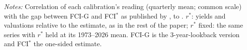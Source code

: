 \begin{table}[tbp]\centering
\caption{Readings and the Gap to FCI*}\label{tab:fcistar}
\begin{flushleft}\footnotesize\textit{Notes:} Correlation of each calibration's reading (quarterly mean; common scale) with the gap between FCI-G and FCI$^*$ as published by \citet{caballero2026},  to . $r^*$: yields and valuations relative to the \citet{laubach2003} estimate, as in the rest of the paper; $r^*$ fixed: the same series with $r^*$ held at its 1973--2026 mean. FCI-G is the 3-year-lookback version and FCI$^*$ the one-sided estimate.\end{flushleft}
\end{table}
